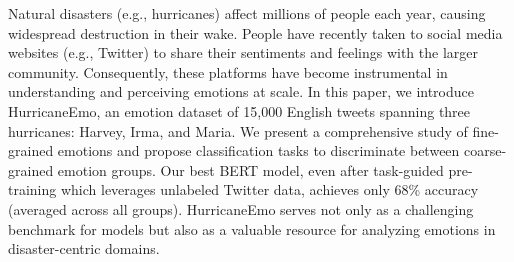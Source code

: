 Natural disasters (e.g., hurricanes) affect millions of people each year, causing widespread destruction in their wake. People have recently taken to social media websites (e.g., Twitter) to share their sentiments and feelings with the larger community. Consequently, these platforms have become instrumental in understanding and perceiving emotions at scale. In this paper, we introduce HurricaneEmo, an emotion dataset of 15,000 English tweets spanning three hurricanes: Harvey, Irma, and Maria. We present a comprehensive study of fine-grained emotions and propose classification tasks to discriminate between coarse-grained emotion groups. Our best BERT model, even after task-guided pre-training which leverages unlabeled Twitter data, achieves only 68\% accuracy (averaged across all groups). HurricaneEmo serves not only as a challenging benchmark for models but also as a valuable resource for analyzing emotions in disaster-centric domains.
